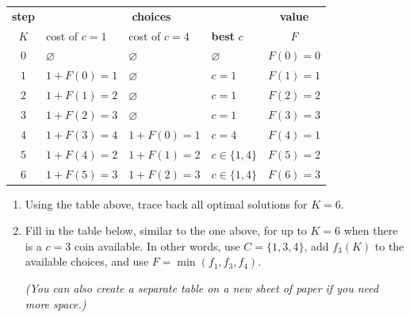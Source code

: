 \documentclass[a4paper]{article}
\begin{document}
\begin{center}
  \begin{tabular}{|c|l|l|l|c|}
    \hline
    \textbf{step} &
    \multicolumn{3}{|c|}{\textbf{choices}} &
    \textbf{value}
    \\
    $K$ &
    cost of $c=1$ &
    cost of $c=4$ &
    \textbf{best} $c$ &
    $F$ \\
    \hline
    $0$ &
    $\varnothing$ &
    $\varnothing$ &
    $\varnothing$ &
    $F(0) = 0$
    \\
    \hline
    $1$ &
    $1+F(0)=1$ &
    $\varnothing$ &
    $c=1$ &
    $F(1) = 1$
    \\
    \hline
    $2$ &
    $1+F(1)=2$ &
    $\varnothing$ &
    $c=1$ &
    $F(2) = 2$
    \\
    \hline
    $3$ &
    $1+F(2)=3$ &
    $\varnothing$ &
    $c=1$ &
    $F(3) = 3$
    \\
    \hline
    $4$ &
    $1+F(3)=4$ &
    $1+F(0)=1$ &
    $c=4$ &
    $F(4) = 1$
    \\
    \hline
    $5$ &
    $1+F(4)=2$ &
    $1+F(1)=2$ &
    $c\in\{1,4\}$ &
    $F(5) = 2$
    \\
    \hline
    $6$ &
    $1+F(5)=3$ &
    $1+F(2)=3$ &
    $c\in\{1,4\}$ &
    $F(6) = 3$
    \\
    \hline
  \end{tabular}
\end{center}

\vfill

\begin{enumerate}
\item
  Using the table above, trace back all optimal solutions for $K=6$.
\item
  Fill in the table below, similar to the one above, for up to $K=6$ when there is a $c=3$ coin available.
  In other words, use $C=\{1, 3, 4\}$, add $f_3(K)$ to the available choices, and use $F=\min(f_1, f_3, f_4)$.
  
  \emph{(You can also create a separate table on a new sheet of paper if you need more space.)}
\end{enumerate}

\vfill
\end{document}
